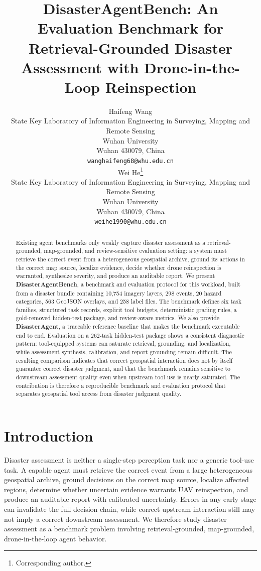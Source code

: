 \documentclass{article}
\title{DisasterAgentBench: An Evaluation Benchmark for Retrieval-Grounded Disaster Assessment with Drone-in-the-Loop Reinspection}
\author{%
  Haifeng Wang \\
  State Key Laboratory of Information Engineering in Surveying, Mapping and Remote Sensing \\
  Wuhan University \\
  Wuhan 430079, China \\
  \texttt{wanghaifeng68@whu.edu.cn} \\
  \And
  Wei He\thanks{Corresponding author.} \\
  State Key Laboratory of Information Engineering in Surveying, Mapping and Remote Sensing \\
  Wuhan University \\
  Wuhan 430079, China \\
  \texttt{weihe1990@whu.edu.cn} \\
}
\newcommand{\datasetfiles}{10{,}754}
\newcommand{\datasetevents}{298}
\newcommand{\datasethazards}{20}
\newcommand{\datasetgeojson}{563}
\newcommand{\datasetlabels}{258}
\begin{document}
\maketitle

\begin{abstract}
Existing agent benchmarks only weakly capture disaster assessment as a retrieval-grounded, map-grounded, and review-sensitive evaluation setting: a system must retrieve the correct event from a heterogeneous geospatial archive, ground its actions in the correct map source, localize evidence, decide whether drone reinspection is warranted, synthesize severity, and produce an auditable report. We present \textbf{DisasterAgentBench}, a benchmark and evaluation protocol for this workload, built from a disaster bundle containing \datasetfiles{} imagery layers, \datasetevents{} events, \datasethazards{} hazard categories, \datasetgeojson{} GeoJSON overlays, and \datasetlabels{} label files. The benchmark defines six task families, structured task records, explicit tool budgets, deterministic grading rules, a gold-removed hidden-test package, and review-aware metrics. We also provide \textbf{DisasterAgent}, a traceable reference baseline that makes the benchmark executable end to end. Evaluation on a 262-task hidden-test package shows a consistent diagnostic pattern: tool-equipped systems can saturate retrieval, grounding, and localization, while assessment synthesis, calibration, and report grounding remain difficult. The resulting comparison indicates that correct geospatial interaction does not by itself guarantee correct disaster judgment, and that the benchmark remains sensitive to downstream assessment quality even when upstream tool use is nearly saturated. The contribution is therefore a reproducible benchmark and evaluation protocol that separates geospatial tool access from disaster judgment quality.
\end{abstract}

\section{Introduction}

Disaster assessment is neither a single-step perception task nor a generic tool-use task. A capable agent must retrieve the correct event from a large heterogeneous geospatial archive, ground decisions on the correct map source, localize affected regions, determine whether uncertain evidence warrants UAV reinspection, and produce an auditable report with calibrated uncertainty. Errors in any early stage can invalidate the full decision chain, while correct upstream interaction still may not imply a correct downstream assessment. We therefore study disaster assessment as a benchmark problem involving retrieval-grounded, map-grounded, drone-in-the-loop agent behavior.
\end{document}
